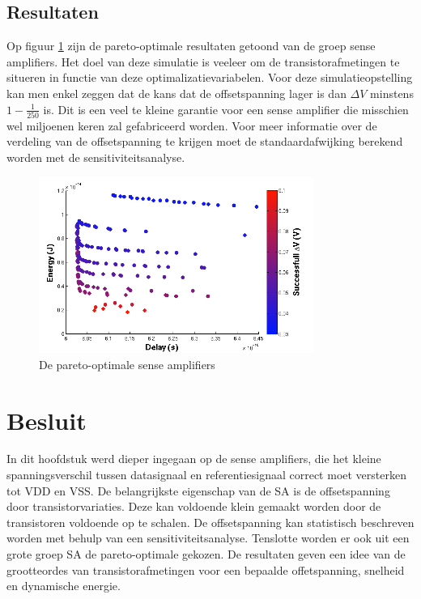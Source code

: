 \subsection{Resultaten}
Op figuur \ref{fig:pareto} zijn de pareto-optimale resultaten getoond van de groep sense amplifiers. Het doel van deze simulatie is veeleer om de transistorafmetingen te situeren in functie van deze optimalizatievariabelen. Voor deze simulatieopstelling kan men enkel zeggen dat de kans dat de offsetspanning lager is dan $\Delta V$ minstens $1 -\frac{1}{250}$ is. Dit is een veel te kleine garantie voor een sense amplifier die misschien wel miljoenen keren zal gefabriceerd worden. Voor meer informatie over de verdeling van de offsetspanning te krijgen moet de standaardafwijking berekend worden met de sensitiviteitsanalyse.

\begin{figure}
  \centering
  \includegraphics[width=0.8\textwidth]{../fig/hfdstk-sensamp-pareto2.png}
  \caption[De pareto-optimale sense amplifiers]{De pareto-optimale sense amplifiers}
  \label{fig:pareto}
\end{figure}

\section{Besluit}
In dit hoofdstuk werd dieper ingegaan op de sense amplifiers, die het kleine spanningsverschil tussen datasignaal en referentiesignaal correct moet versterken tot VDD en VSS. De belangrijkste eigenschap van de SA is de offsetspanning door transistorvariaties. Deze kan voldoende klein gemaakt worden door de transistoren voldoende op te schalen. De offsetspanning kan statistisch beschreven worden met behulp van een sensitiviteitsanalyse. Tenslotte worden er ook uit een grote groep SA de pareto-optimale gekozen. De resultaten geven een idee van de grootteordes van transistorafmetingen voor een bepaalde offetspanning, snelheid en dynamische energie.
